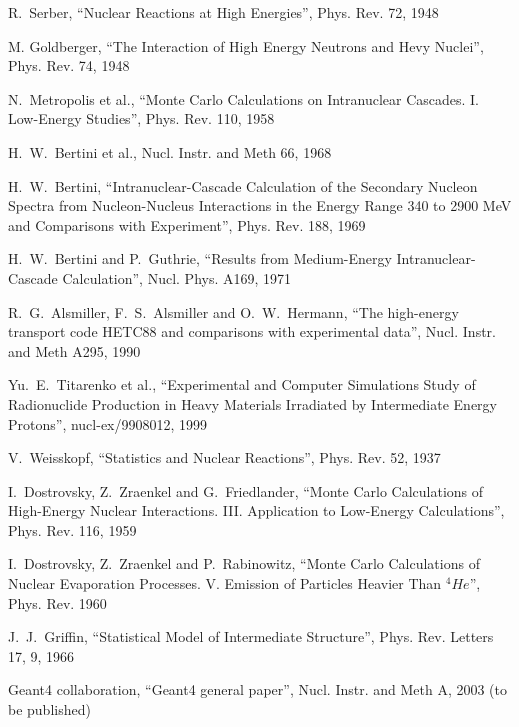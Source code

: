 \documentclass[twocolumn,twoside,slac]{revtex4}
\begin{document}
\begin{thebibliography}{9}

R.~Serber, ``Nuclear Reactions at High Energies'',
Phys. Rev. 72, 1948

M. Goldberger, ``The Interaction of High Energy Neutrons and Hevy Nuclei'',
Phys. Rev. 74, 1948

N.~Metropolis et al., ``Monte Carlo Calculations on Intranuclear Cascades. I. Low-Energy Studies'',
Phys. Rev. 110, 1958

H.~W.~Bertini et al.,
Nucl. Instr. and Meth  66, 1968


H.~W.~Bertini, ``Intranuclear-{C}ascade {C}alculation of the {S}econdary {N}ucleon {S}pectra from {N}ucleon-{N}ucleus 
        {I}nteractions in the {E}nergy {R}ange 340 to 2900 {M}e{V} and {C}omparisons with {E}xperiment'',
Phys. Rev.  188, 1969


H.~W.~Bertini and P.~Guthrie, ``Results from Medium-Energy Intranuclear-Cascade Calculation'',
Nucl. Phys.  A169, 1971

R.~G.~Alsmiller, F.~S.~Alsmiller and O.~W.~Hermann, 
``The high-energy transport code HETC88 and comparisons with experimental data'',
Nucl. Instr. and Meth A295, 1990

Yu.~E.~Titarenko et al.,
``Experimental and Computer Simulations Study of
		  Radionuclide Production in Heavy Materials
		  Irradiated by Intermediate Energy Protons'',
nucl-ex/9908012, 1999

V.~Weisskopf,
``Statistics and {N}uclear {R}eactions'',
Phys. Rev. 52, 1937

I.~Dostrovsky, Z.~Zraenkel and G.~Friedlander,
``Monte {C}arlo {C}alculations of {H}igh-{E}nergy {N}uclear {I}nteractions. {I}{I}{I}. 
{A}pplication to {L}ow-{E}nergy {C}alculations'',
Phys. Rev. 116, 1959

I.~Dostrovsky, Z.~Zraenkel and P.~Rabinowitz,
``Monte Carlo Calculations of Nuclear Evaporation Processes. V. Emission of Particles Heavier Than $^4\!He$'',
Phys. Rev. 1960


J.~J.~Griffin,
``Statistical Model of Intermediate Structure'',
Phys. Rev. Letters 17, 9, 1966

Geant4 collaboration,
``Geant4 general paper'',
Nucl. Instr. and Meth A, 2003 (to be published)


\end{thebibliography}
\end{document}
